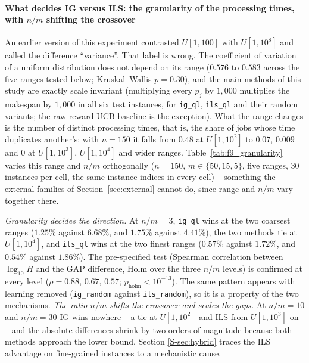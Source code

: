 \documentclass[final,3p,times,11pt,authoryear]{elsarticle}
\begin{document}
\paragraph{What decides IG versus ILS: the granularity of the processing
times, with $n/m$ shifting the crossover}
An earlier version of this experiment contrasted $U[1,100]$ with
$U[1,10^8]$ and called the difference ``variance''. That label is
wrong. The coefficient of variation of a uniform distribution does not
depend on its range ($0.576$ to $0.583$ across the five ranges tested
below; Kruskal--Wallis $p=0.30$), and the main methods of this study are
exactly scale invariant (multiplying every $p_j$ by $1{,}000$
multiplies the makespan by $1{,}000$ in all six test instances, for
\texttt{ig\_ql}, \texttt{ils\_ql} and their random variants; the
raw-reward UCB baseline is the exception). What the range changes is the
number of distinct processing times, that is, the share of jobs whose
time duplicates another's: with $n=150$ it falls from $0.48$ at
$U[1,10^2]$ to $0.07$, $0.009$ and $0$ at $U[1,10^3]$, $U[1,10^4]$ and
wider ranges. Table~\ref{tab:f9_granularity} varies this range and $n/m$
orthogonally ($n=150$, $m \in \{50,15,5\}$, five ranges, $30$ instances
per cell, the same instance indices in every cell) -- something the
external families of Section~\ref{sec:external} cannot do, since range
and $n/m$ vary together there.



\emph{Granularity decides the direction.} At $n/m=3$, \texttt{ig\_ql}
wins at the two coarsest ranges ($1.25\%$ against $6.68\%$, and $1.75\%$
against $4.41\%$), the two methods tie at $U[1,10^4]$, and
\texttt{ils\_ql} wins at the two finest ranges ($0.57\%$ against
$1.72\%$, and $0.54\%$ against $1.86\%$). The pre-specified test
(Spearman correlation between $\log_{10} H$ and the GAP difference,
Holm over the three $n/m$ levels) is confirmed at every level
($\rho = 0.88$, $0.67$, $0.57$; $p_{\mathrm{holm}} < 10^{-13}$). The
same pattern appears with learning removed (\texttt{ig\_random} against
\texttt{ils\_random}), so it is a property of the two mechanisms.
\emph{The ratio $n/m$ shifts the crossover and scales the gaps.} At
$n/m=10$ and $n/m=30$ IG wins nowhere -- a tie at $U[1,10^2]$ and ILS
from $U[1,10^3]$ on -- and the absolute differences shrink by two orders
of magnitude because both methods approach the lower bound. Section
\ref{S-sec:hybrid} traces the ILS advantage on fine-grained instances
to a mechanistic cause.
\end{document}
